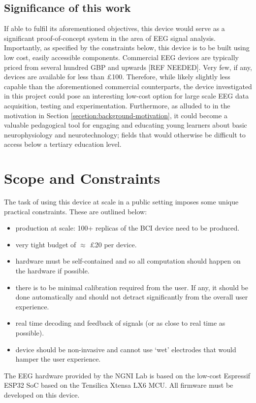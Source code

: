 \subsection{Significance of this work}
If able to fulfil its aforementioned objectives, this device would serve as a significant proof-of-concept system in the area of EEG signal analysis. Importantly, as specified by the constraints below, this device is to be built using low cost, easily accessible components. Commercial EEG devices are typically priced from several hundred GBP and upwards [REF NEEDED]. Very few, if any, devices are available for less than £100. Therefore, while likely slightly less capable than the aforementioned commercial counterparts, the device investigated in this project could pose an interesting low-cost option for large scale EEG data acquisition, testing and experimentation. Furthermore, as alluded to in the motivation in Section \ref{secetion:background-motivation}, it could become a valuable pedagogical tool for engaging and educating young learners about basic neurophysiology and neurotechnology; fields that would otherwise be difficult to access below a tertiary education level.


\section{Scope and Constraints}
The task of using this device at scale in a public setting imposes some unique practical constraints. These are outlined below:
\begin{itemize}
    \item production at scale: 100+ replicas of the BCI device need to be produced.
    \item very tight budget of $\approx$ £20 per device.
    \item hardware must be self-contained and so all computation should happen on the hardware if possible. 
    \item there is to be minimal calibration required from the user. If any, it should be done automatically and should not detract significantly from the overall user experience.
    \item real time decoding and feedback of signals (or as close to real time as possible).
    \item device should be non-invasive and cannot use `wet' electrodes that would hamper the user experience.
\end{itemize}
The EEG hardware provided by the NGNI Lab is based on the low-cost Espressif ESP32 SoC based on the Tensilica Xtensa LX6 MCU. All firmware must be developed on this device.

